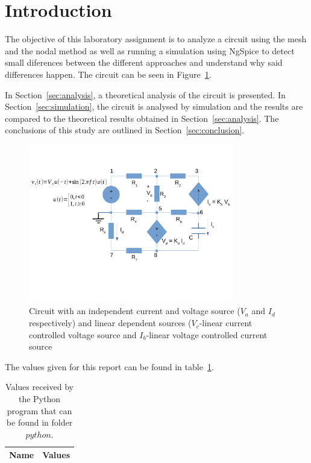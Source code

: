 \newpage
\section{Introduction}
\label{sec:introduction}


The objective of this laboratory assignment is to analyze a circuit using the mesh and the nodal method as well as running a simulation using NgSpice to detect small diferences between the different approaches and understand why said differences happen. The circuit can be seen in Figure~\ref{fig:circuit}.

In Section~\ref{sec:analysis}, a theoretical analysis of the circuit is
presented. In Section~\ref{sec:simulation}, the circuit is analysed by
simulation and the results are compared to the theoretical results obtained in
Section~\ref{sec:analysis}. The conclusions of this study are outlined in
Section~\ref{sec:conclusion}.

\squeezeup
\begin{figure}[h!] \centering
\includegraphics[width=0.8\textwidth, scale=1.0]{circuit.pdf}
\squeezeup
\caption{Circuit with an independent current and voltage source ($V_a$ and $I_d$ respectively) and linear dependent sources ($V_c$-linear current controlled voltage source and $I_b$-linear voltage controlled current source}
\label{fig:circuit}
\end{figure}

The values given for this report can be found in table~\ref{tab:op1}.

\begin{table}[hb]
  \centering
  \begin{tabular}{|l|r|}
    \hline    
    {\bf Name} & {\bf Values} \\ \hline
    
  \end{tabular}
  \caption{Values received by the Python program that can be found in folder $python$.}
  \label{tab:op1}
\end{table}


